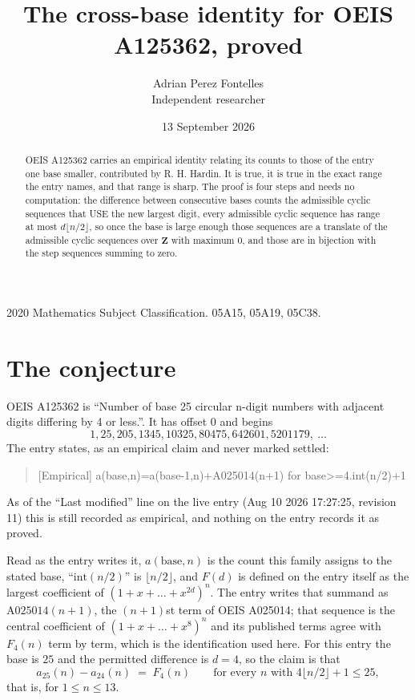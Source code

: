\documentclass[11pt,a4paper]{article}
\title{The cross-base identity for OEIS A125362, proved}
\author{Adrian Perez Fontelles\\ \small Independent researcher}
\date{13 September 2026}
\theoremstyle{plain}
\theoremstyle{definition}
\begin{document}
\maketitle

\begin{abstract}
OEIS A125362 carries an empirical identity relating its counts to those of the entry one base
smaller, contributed by R. H. Hardin. It is true, it is true in the exact range the entry
names, and that range is sharp. The proof is four steps and needs no computation: the
difference between consecutive bases counts the admissible cyclic sequences that USE the new
largest digit, every admissible cyclic sequence has range at most $d\lfloor n/2\rfloor$, so
once the base is large enough those sequences are a translate of the admissible cyclic
sequences over $\mathbf{Z}$ with maximum $0$, and those are in bijection with the step
sequences summing to zero.
\end{abstract}

\noindent\small 2020 Mathematics Subject Classification. 05A15, 05A19, 05C38.\normalsize

\section{The conjecture}

OEIS A125362 is ``Number of base 25 circular n-digit numbers with adjacent digits differing by 4 or less.''. It has offset $0$ and begins
\[
1, 25, 205, 1345, 10325, 80475, 642601, 5201179,\ \dots
\]
The entry states, as an empirical claim and never marked settled:
\begin{quote}
[Empirical] a(base,n)=a(base-1,n)+A025014(n+1) for base>=4.int(n/2)+1
\end{quote}
As of the ``Last modified'' line on the live entry (Aug 10 2026 17:27:25, revision 11)
this is still recorded as empirical, and nothing on the entry records it as proved.

Read as the entry writes it, $a(\mathrm{base},n)$ is the count this family assigns to the
stated base, ``$\mathrm{int}(n/2)$'' is $\lfloor n/2\rfloor$, and $F(d)$ is defined on the
entry itself as the largest coefficient of $(1+x+\dots+x^{2d})^{n}$. The entry writes that summand as $\mathrm{A025014}(n+1)$, the $(n+1)$st term of OEIS A025014; that sequence is the central coefficient of $(1+x+\dots+x^{8})^{n}$ and its published terms agree with $F_{4}(n)$ term by term, which is the identification used here. For this entry
the base is $25$ and the permitted difference is $d=4$, so the claim is that
\[
a_{25}(n)-a_{24}(n)\;=\;F_{4}(n)
\qquad\text{for every } n \text{ with } 4\lfloor n/2\rfloor+1\le25,
\]
that is, for $1\le n\le13$.
\end{document}
